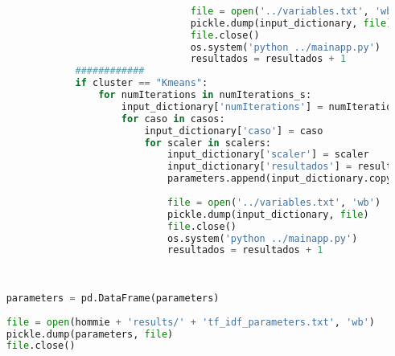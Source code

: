\documentclass[12pt]{article}
\begin{document}
\begin{lstlisting}[language=Python, 
	caption = Rutina de pruebas TFI-DF,
	label={lst:pruebasTfIdf}]
									
									file = open('../variables.txt', 'wb')
									pickle.dump(input_dictionary, file)
									file.close()
									os.system('python ../mainapp.py')
									resultados = resultados + 1 
				############
				if cluster == "Kmeans":
					for numIterations in numIterations_s:
						input_dictionary['numIterations'] = numIterations              
						for caso in casos:
							input_dictionary['caso'] = caso
							for scaler in scalers:
								input_dictionary['scaler'] = scaler
								input_dictionary['resultados'] = resultados      
								parameters.append(input_dictionary.copy())                              
								
								file = open('../variables.txt', 'wb')
								pickle.dump(input_dictionary, file)
								file.close()
								os.system('python ../mainapp.py')
								resultados = resultados + 1 
	
	
	
	parameters = pd.DataFrame(parameters)
	
	file = open(hommie + 'results/' + 'tf_idf_parameters.txt', 'wb')
	pickle.dump(parameters, file)
	file.close()
	
	
	\end{lstlisting}
\end{document}
